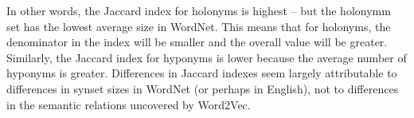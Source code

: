 \documentclass{article}
\begin{document}
In other words, the Jaccard index for holonyms is highest -- but the holonymm set has the lowest average size in WordNet. This means that for holonyms, the denominator in the index will be smaller and the overall value will be greater. Similarly, the Jaccard index for hyponyms is lower because the average number of hyponyms is greater. Differences in Jaccard indexes seem largely attributable to differences in synset sizes in WordNet (or perhaps in English), not to differences in the semantic relations uncovered by Word2Vec.



\end{document}
